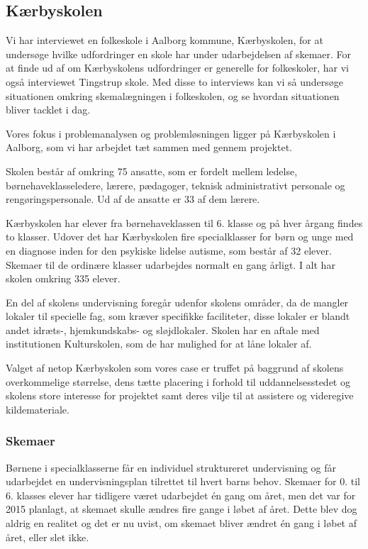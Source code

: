 \subsection{Kærbyskolen}
\label{Kaerbyskolen}
Vi har interviewet en folkeskole i Aalborg kommune, Kærbyskolen, for at undersøge hvilke udfordringer en skole har under udarbejdelsen af skemaer. For at finde ud af om Kærbyskolens udfordringer er generelle for folkeskoler, har vi også interviewet Tingstrup skole. Med disse to interviews kan vi så undersøge situationen omkring skemalægningen i folkeskolen, og se hvordan situationen bliver tacklet i dag.


Vores fokus i problemanalysen og problemløsningen ligger på Kærbyskolen i Aalborg, som vi har arbejdet tæt sammen med gennem projektet.

Skolen består af omkring 75 ansatte, som er fordelt mellem ledelse, børnehaveklasseledere, lærere, pædagoger, teknisk administrativt personale og rengøringspersonale. Ud af de ansatte er 33 af dem lærere.

Kærbyskolen har elever fra børnehaveklassen til 6. klasse og på hver årgang findes to klasser. Udover det har Kærbyskolen fire specialklasser for børn og unge med en diagnose inden for den psykiske lidelse autisme, som består af 32 elever\cite{KaerbyskolensElevtal}. Skemaer til de ordinære klasser udarbejdes normalt en gang årligt. I alt har skolen omkring 335 elever.

En del af skolens undervisning foregår udenfor skolens områder, da de mangler lokaler til specielle fag, som kræver specifikke faciliteter, disse lokaler er blandt andet idræts-, hjemkundskabs- og sløjdlokaler. Skolen har en aftale med institutionen Kulturskolen, som de har mulighed for at låne lokaler af.

Valget af netop Kærbyskolen som vores case er truffet på baggrund af skolens overkommelige størrelse, dens tætte placering i forhold til uddannelsesstedet og skolens store interesse for projektet samt deres vilje til at assistere og videregive kildemateriale.

\subsubsection{Skemaer}
\label{Skemaer}
Børnene i specialklasserne får en individuel struktureret undervisning og får udarbejdet en undervisningsplan tilrettet til hvert barns behov\cite{j_klasser}.
Skemaer for 0. til 6. klasses elever har tidligere været udarbejdet \'en gang om året, men det var for 2015 planlagt, at skemaet skulle ændres fire gange i løbet af året. Dette blev dog aldrig en realitet og det er nu uvist, om skemaet bliver ændret \'en gang i løbet af året, eller slet ikke.


